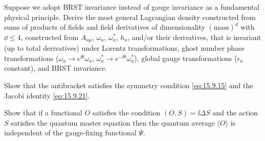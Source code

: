 \begin{enumerate}
   Suppose we adopt BRST invariance instead of gauge invariance as a fundamental physical principle. Derive the most general Lagrangian density constructed from sums of products of fields and field derivatives of dimensionality $(\text{mass})^d$ with $\dd\leq4$, constructed from $A_{a\mu}$, $\omega_a$, $\omega_a^*$, $h_a$, and/or their derivatives, that is invariant (up to total derivatives) under Lorentz transformations, ghost number phase transformations ($\omega_a\longrightarrow e^{\ii\theta}\omega_a$, $\omega_a^*\longrightarrow e^{-\ii\theta}\omega_a^*$), global gauge transformations ($\epsilon_a$ constant), and BRST invariance.

   Show that the antibracket satisfies the symmetry condition \eqref{eq:15.9.15} and the Jacobi identity \eqref{eq:15.9.21}.

   Show that if a functional $O$ satisfies the condition $(O,S)=\ii\Delta S$ and the action $S$ satisfies the quantum master equation then the quantum average $\langle O\rangle$ is independent of the gauge-fixing functional $\Psi$.
\end{enumerate}
